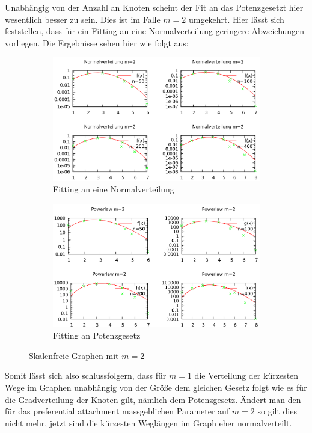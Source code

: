 \documentclass[10pt]{article}
\begin{document}
Unabhängig von der Anzahl an Knoten scheint der Fit an das Potenzgesetzt hier wesentlich besser zu sein. Dies ist im Falle $m=2$ umgekehrt. Hier lässt sich feststellen, dass für ein Fitting an eine Normalverteilung geringere Abweichungen vorliegen. Die Ergebnisse sehen hier wie folgt aus:

\begin{figure}[h!]
\begin{subfigure}{.5\textwidth}
  \centering
  \includegraphics[width=.7\linewidth]{../Results/Normal_M2_logscale.png}
  \caption{Fitting an eine Normalverteilung}
  \label{fig:sfig1}
\end{subfigure}%
\begin{subfigure}{.5\textwidth}
  \centering
  \includegraphics[width=.7\linewidth]{../Results/Power_M2_logscale.png}
  \caption{Fitting an Potenzgesetz}
  \label{fig:sfig2}
\end{subfigure}
\caption{Skalenfreie Graphen mit $m=2$}
\label{fig:m2}
\end{figure}

Somit lässt sich also schlussfolgern, dass für $m=1$ die Verteilung der kürzesten Wege im Graphen unabhängig von der Größe dem gleichen Gesetz folgt wie es für die Gradverteilung der Knoten gilt, nämlich dem Potenzgesetz. Ändert man den für das preferential attachment massgeblichen Parameter auf $m=2$ so gilt dies nicht mehr, jetzt sind die kürzesten Weglängen im Graph eher normalverteilt. 
\end{document}
